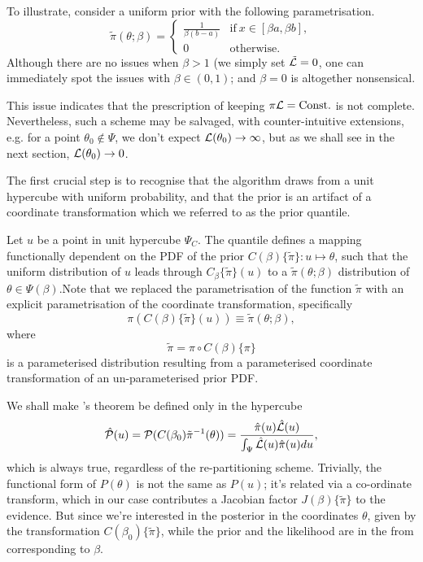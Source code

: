 \documentclass[usenatbib]{mnras}
\begin{document}
To illustrate, consider a uniform prior with the following
parametrisation.
\begin{equation}
  \tilde{\pi}(\theta; \beta) =
  \begin{cases}
	\frac{1}{\beta(b-a)} & \text{if}\ x \in [\beta a, \beta b], \\
	0 & \text{otherwise}.
  \end{cases}
\end{equation}
Although there are no issues when \(\beta>1\) (we simply set \({\cal
	\tilde{L}}=0\), one can immediately spot the issues with \(\beta \in (0,1)\);
and \(\beta=0\) is altogether nonsensical.

This issue indicates that the prescription of keeping \(\pi {\cal
	L} = \text{Const.}\) is not complete. Nevertheless, such a scheme
may be salvaged, with counter-intuitive extensions, e.g. for a
point \(\theta_{0} \notin \Psi\), we don't expect \({\cal
	L}(\theta_{0}) \rightarrow \infty\), but as we shall see in the
next section, \({\cal L}(\theta_{0}) \rightarrow 0\).

The first crucial step is to recognise that the algorithm draws
from a unit hypercube with uniform probability, and that the prior
is an artifact of a coordinate transformation which we referred to
as the prior quantile.

Let \(u\) be a point in unit hypercube \(\Psi_{C}\). The quantile
defines a mapping functionally dependent on the PDF of the prior
\(C(\beta)\lbrace \tilde{\pi}\rbrace:u \mapsto \theta\), such that
the uniform distribution of \(u\) leads through
\(C_{\beta}\{\tilde{\pi}\}(u)\) to a \(\tilde{\pi}(\theta;\beta)\)
distribution of \(\theta \in\Psi(\beta)\).Note that we replaced the
parametrisation of the function \(\tilde{\pi}\) with an explicit
parametrisation of the coordinate transformation, specifically
\begin{equation}
  \pi(C(\beta)\{\tilde{\pi}\}(u)) \equiv \tilde{\pi}(\theta; \beta),
\end{equation}
where 
\begin{equation}
  \tilde{\pi} =  \pi \circ C(\beta) \{ \pi \} 
\end{equation}
is a parameterised distribution resulting from a parameterised
coordinate transformation of an un-parameterised prior PDF.

We shall make \citeauthor{1763} 's theorem be defined only in the
hypercube
\begin{equation}
{\cal \hat{P}}(u) = {\cal P}(C(\beta_{0}){\tilde{\pi}}^{-1}(\theta)) = \frac{\hat{\pi} (u) {\cal \hat{L}}(u)}{\int_{\Psi}{\cal \hat{L}}(u) \hat{\pi}(u) du},
\end{equation}
which is always true, regardless of the re-partitioning
scheme. Trivially, the functional form of \(P(\theta)\) is not the same
as \(P(u)\); it's related via a co-ordinate transform, which in our
case contributes a Jacobian factor \(J(\beta)\{\tilde{\pi}\}\) to the
evidence. But since we're interested in the posterior in the
coordinates \(\theta\), given by the transformation \(C(\beta_{0})\{\tilde{\pi}\}\),
while the prior and the likelihood are in the from corresponding
to \(\beta\).
\end{document}
